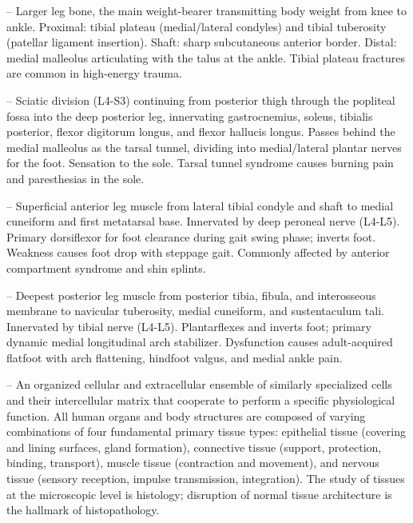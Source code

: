 -- Larger leg bone, the main weight-bearer transmitting body weight from knee to ankle. Proximal: tibial plateau (medial/lateral condyles) and tibial tuberosity (patellar ligament insertion). Shaft: sharp subcutaneous anterior border. Distal: medial malleolus articulating with the talus at the ankle. Tibial plateau fractures are common in high-energy trauma.

-- Sciatic division (L4-S3) continuing from posterior thigh through the popliteal fossa into the deep posterior leg, innervating gastrocnemius, soleus, tibialis posterior, flexor digitorum longus, and flexor hallucis longus. Passes behind the medial malleolus as the tarsal tunnel, dividing into medial/lateral plantar nerves for the foot. Sensation to the sole. Tarsal tunnel syndrome causes burning pain and paresthesias in the sole.

-- Superficial anterior leg muscle from lateral tibial condyle and shaft to medial cuneiform and first metatarsal base. Innervated by deep peroneal nerve (L4-L5). Primary dorsiflexor for foot clearance during gait swing phase; inverts foot. Weakness causes foot drop with steppage gait. Commonly affected by anterior compartment syndrome and shin splints.

-- Deepest posterior leg muscle from posterior tibia, fibula, and interosseous membrane to navicular tuberosity, medial cuneiform, and sustentaculum tali. Innervated by tibial nerve (L4-L5). Plantarflexes and inverts foot; primary dynamic medial longitudinal arch stabilizer. Dysfunction causes adult-acquired flatfoot with arch flattening, hindfoot valgus, and medial ankle pain.

-- An organized cellular and extracellular ensemble of similarly specialized cells and their intercellular matrix that cooperate to perform a specific physiological function. All human organs and body structures are composed of varying combinations of four fundamental primary tissue types: epithelial tissue (covering and lining surfaces, gland formation), connective tissue (support, protection, binding, transport), muscle tissue (contraction and movement), and nervous tissue (sensory reception, impulse transmission, integration). The study of tissues at the microscopic level is histology; disruption of normal tissue architecture is the hallmark of histopathology.


